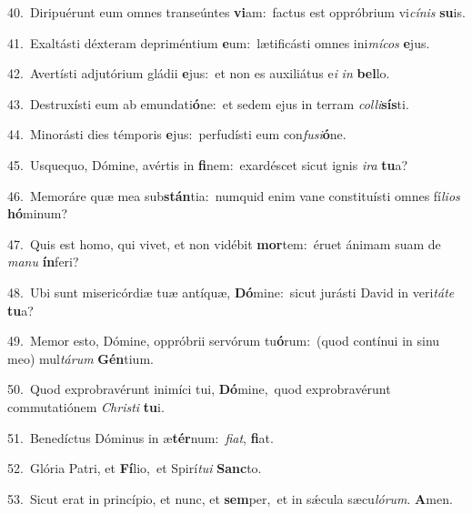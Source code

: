{\numbfont\textcolor{\numbcolor}{40.}}~Diripuérunt eum omnes transeúntes \textbf{vi}\-am:~\star factus est oppróbrium vi\-\textit{cí}\-\textit{nis} \textbf{su}\-is.\par
{\numbfont\textcolor{\numbcolor}{41.}}~Exaltásti déxteram depriméntium \textbf{e}\-um:~\star lætificásti omnes ini\-\textit{mí}\-\textit{cos} \textbf{e}\-jus.\par
{\numbfont\textcolor{\numbcolor}{42.}}~Avertísti adjutórium gládii \textbf{e}\-jus:~\star et non es auxiliátus e\textit{i} \textit{in} \textbf{bel}\-lo.\par
{\numbfont\textcolor{\numbcolor}{43.}}~Destruxísti eum ab emundati\-\textbf{ó}\-ne:~\star et sedem ejus in terram \textit{col}\-\textit{li}\textbf{sís}ti.\par
{\numbfont\textcolor{\numbcolor}{44.}}~Minorásti dies témporis \textbf{e}\-jus:~\star perfudísti eum con\-\textit{fu}\-\textit{si}\textbf{ó}ne.\par
{\numbfont\textcolor{\numbcolor}{45.}}~Usquequo, Dómine, avértis in \textbf{fi}\-nem:~\star exardéscet sicut ignis \textit{i}\-\textit{ra} \textbf{tu}\-a?\par
{\numbfont\textcolor{\numbcolor}{46.}}~Memoráre quæ mea sub\-\textbf{stán}\-tia:~\star numquid enim vane constituísti omnes fí\-\textit{li}\-\textit{os} \textbf{hó}\-minum?\par
{\numbfont\textcolor{\numbcolor}{47.}}~Quis est homo, qui vivet, et non vidébit \textbf{mor}\-tem:~\star éruet ánimam suam de \textit{ma}\-\textit{nu} \textbf{ín}\-feri?\par
{\numbfont\textcolor{\numbcolor}{48.}}~Ubi sunt misericórdiæ tuæ antíquæ, \textbf{Dó}\-mine:~\star sicut jurásti David in veri\-\textit{tá}\-\textit{te} \textbf{tu}\-a?\par
{\numbfont\textcolor{\numbcolor}{49.}}~Memor esto, Dómine, oppróbrii servórum tu\-\textbf{ó}\-rum:~\star (quod contínui in sinu meo) mul\-\textit{tá}\-\textit{rum} \textbf{Gén}\-tium.\par
{\numbfont\textcolor{\numbcolor}{50.}}~Quod exprobravérunt inimíci tui, \textbf{Dó}\-mine,~\star quod exprobravérunt commutatiónem \textit{Chris}\-\textit{ti} \textbf{tu}\-i.\par
{\numbfont\textcolor{\numbcolor}{51.}}~Benedíctus Dóminus in æ\-\textbf{tér}\-num:~\star \textit{fi}\-\textit{at}, \textbf{fi}\-at.\par
{\numbfont\textcolor{\numbcolor}{52.}}~Glória Patri, et \textbf{Fí}\-lio,~\star et Spirí\-\textit{tu}\-\textit{i} \textbf{Sanc}\-to.\par
{\numbfont\textcolor{\numbcolor}{53.}}~Sicut erat in princípio, et nunc, et \textbf{sem}\-per,~\star et in sǽcula sæcu\-\textit{ló}\-\textit{rum}. \textbf{A}\-men.\par
